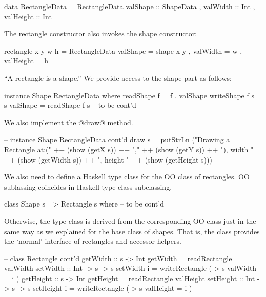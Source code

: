 \documentclass{jfp}
\begin{document}
\begin{code}
 data RectangleData =
      RectangleData { valShape  :: ShapeData
                    , valWidth  :: Int 
                    , valHeight :: Int
                    }
\end{code}

The rectangle constructor also invokes the shape constructor:

\begin{code}
 rectangle x y w h
  = RectangleData { valShape  = shape x y
                  , valWidth  = w
                  , valHeight = h
                  }
\end{code}

``A rectangle is a shape.'' We provide access to the shape part as follows:

\begin{code}
 instance Shape RectangleData
  where
   readShape f    = f . valShape
   writeShape f s = s { valShape = readShape f s } 
   -- to be cont'd
\end{code}

We also implement the @draw@ method.

\begin{code}
   -- instance Shape RectangleData cont'd
   draw s
     =   putStrLn ("Drawing a Rectangle at:("
     ++ (show (getX s))
     ++ ","
     ++ (show (getY s))
     ++ "), width "
     ++ (show (getWidth s))
     ++ ", height "
     ++ (show (getHeight s)))
\end{code}

We also need to define a Haskell type class for the OO class of
rectangles. OO sublassing coincides in Haskell type-class subclassing.

\begin{code}
 class Shape s => Rectangle s
  where
   -- to be cont'd
\end{code}

Otherwise, the type class is derived from the corresponding OO class
just in the same way as we explained for the base class of
shapes. That is, the class provides the `normal' interface of
rectangles and accessor helpers.

\begin{code}
   -- class Rectangle cont'd
   getWidth       :: s -> Int
   getWidth       =  readRectangle valWidth
   setWidth       :: Int -> s -> s
   setWidth i     =  writeRectangle (\s -> s  { valWidth = i })
   getHeight      :: s -> Int
   getHeight      =  readRectangle valHeight
   setHeight      :: Int -> s -> s    
   setHeight i    =  writeRectangle (\s -> s  { valHeight = i })
\end{code}
\end{document}
